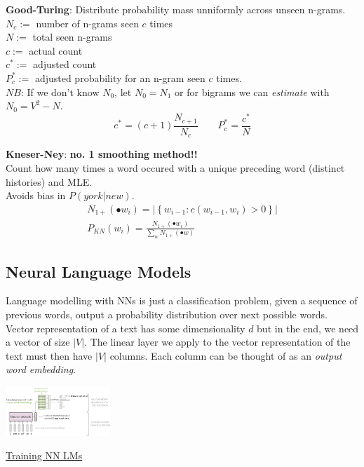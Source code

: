 \documentclass[8pt]{extarticle} %
\begin{document}
\begin{multicols*}{3}
\textbf{Good-Turing}: Distribute probability mass unniformly across unseen n-grams. \\
$N_c:=$ number of n-grams seen $c$ times\\
$N:=$ total seen n-grams\\
${c}:=$ actual count\\
$c^*:=$ adjusted count\\
$P^*_c:=$ adjusted probability for an n-gram seen $c$ times.\\
$NB$: If we don't know $N_0$, let $N_0=N_1$ or for bigrams we can \textit{estimate} with $N_0=V^2-N$. 
    $$c^*=(c+1)\frac{N_{c+1}}{N_{c}}\qquad P^{*}_c=\frac{c^{*}}{N}$$

\textbf{Kneser-Ney}: \textbf{no. 1 smoothing method!!}\\
Count how many times a word occured with a unique preceding word (distinct histories) and MLE. \\
Avoids bias in $P(york|new)$.
$$
\begin{gathered}
N_{1+}\left(\bullet w_i\right)=\left|\left\{w_{i-1}: c\left(w_{i-1}, w_i\right)>0\right\}\right| \\
P_{K N}\left(w_i\right)=\frac{N_{1+}\left(\bullet w_i\right)}{\sum_w N_{1+}(\bullet w)}
\end{gathered}
$$

\subsection*{Neural Language Models}
Language modelling with NNs is just a classification problem, given a sequence of previous words, output a probability distribution over next possible words.\\

Vector representation of a text has some dimensionality $d$ but in the end, we need a vector of size $|V|$. The linear layer we apply to the vector representation of the text must then have $|V|$ columns. Each column can be thought of as an \textit{output word embedding}. 
\begin{center}
    \includegraphics[width=0.3\textwidth]{media/nn-lm.png}
\end{center}

\underline{Training NN LMs}\\


\end{multicols*}
\end{document}
